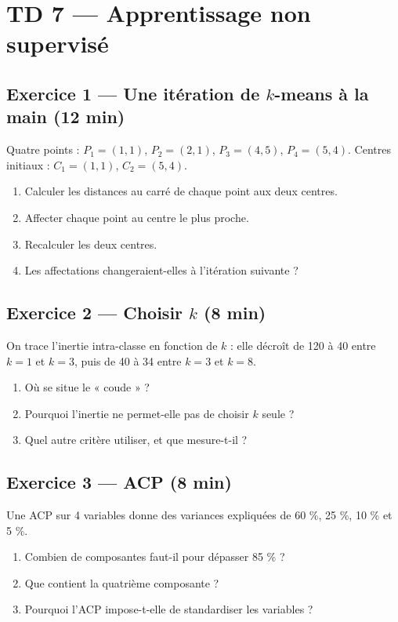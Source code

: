 \section*{TD 7 --- Apprentissage non supervisé}

\subsection*{Exercice 1 --- Une itération de $k$-means à la main \hfill \normalfont\footnotesize (12 min)}
Quatre points : $P_1=(1,1)$, $P_2=(2,1)$, $P_3=(4,5)$, $P_4=(5,4)$.
Centres initiaux : $C_1=(1,1)$, $C_2=(5,4)$.
\begin{enumerate}
  \item Calculer les distances au carré de chaque point aux deux centres.
  \item Affecter chaque point au centre le plus proche.
  \item Recalculer les deux centres.
  \item Les affectations changeraient-elles à l'itération suivante ?
\end{enumerate}

\subsection*{Exercice 2 --- Choisir $k$ \hfill \normalfont\footnotesize (8 min)}
On trace l'inertie intra-classe en fonction de $k$ : elle décroît de 120 à 40
entre $k=1$ et $k=3$, puis de 40 à 34 entre $k=3$ et $k=8$.
\begin{enumerate}
  \item Où se situe le « coude » ?
  \item Pourquoi l'inertie ne permet-elle pas de choisir $k$ seule ?
  \item Quel autre critère utiliser, et que mesure-t-il ?
\end{enumerate}

\subsection*{Exercice 3 --- ACP \hfill \normalfont\footnotesize (8 min)}
Une ACP sur 4 variables donne des variances expliquées de 60 \%, 25 \%, 10 \%
et 5 \%.
\begin{enumerate}
  \item Combien de composantes faut-il pour dépasser 85 \% ?
  \item Que contient la quatrième composante ?
  \item Pourquoi l'ACP impose-t-elle de standardiser les variables ?
\end{enumerate}

